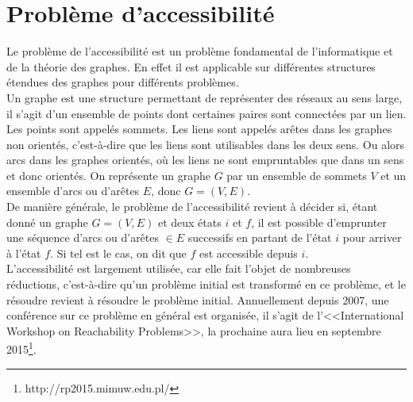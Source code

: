 \documentclass[12pt,a4paper,oneside]{book}
\theoremstyle{break}
\theoremstyle{breakplain}
\begin{document}
\section{Problème d'accessibilité}
Le problème de l'accessibilité est un problème fondamental de l'informatique et de la théorie des graphes. En effet il est applicable sur différentes structures étendues des graphes pour différents problèmes.\\
Un graphe est une structure permettant de représenter des réseaux au sens large, il s'agit d'un ensemble de points dont certaines paires sont connectées  par un lien. Les points sont appelés sommets. Les liens sont appelés arêtes dans les graphes non orientés, c'est-à-dire que les liens sont utilisables dans les deux sens. Ou alors arcs dans les graphes orientés, où les liens ne sont empruntables que dans un sens et donc orientés. On représente un graphe $G$ par un ensemble de sommets $V$ et un ensemble d'arcs ou d'arêtes $E$, donc $G = (V, E)$.\\
De manière générale, le problème de l'accessibilité revient à décider si, étant donné un graphe $G = (V, E)$ et deux états $i$ et $f$, il est possible d'emprunter une séquence d'arcs ou d'arêtes $\in E$ successifs en partant de l'état $i$ pour arriver à l'état $f$. Si tel est le cas, on dit que $f$ est accessible depuis $i$.\\

L'accessibilité est largement utilisée, car elle fait l'objet de nombreuses réductions, c'est-à-dire qu'un problème initial est transformé en ce problème, et le résoudre revient à résoudre le problème initial. Annuellement depuis 2007, une conférence sur ce problème en général est organisée, il s'agit de l'<<International Workshop on Reachability Problems>>, la prochaine aura lieu en septembre 2015\footnote{http://rp2015.mimuw.edu.pl/}.\\
\end{document}
